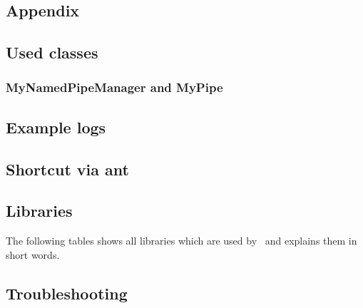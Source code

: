 \begin{appendix}
  \chapter{Appendix}
    \section{Used classes}
      \subsection{MyNamedPipeManager and MyPipe}
	\setJavaCodeListing
	\lstset{caption=MyNamedPipeManager.java}
	

	\setJavaCodeListing
	\lstset{caption=MyPipe.java}
	

    \section{Example logs}
    \section{Shortcut via ant}
    \section{Libraries}
      The following tables shows all libraries which are used by \Kieker\ and explains them in short words.
      
    \section{Troubleshooting}
\end{appendix}